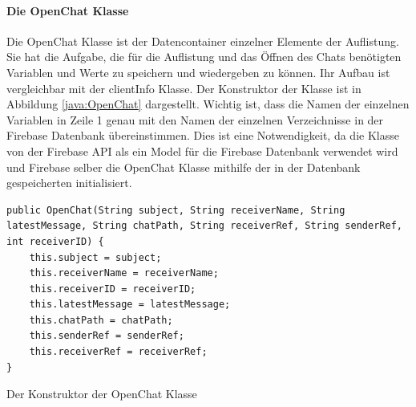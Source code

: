 \documentclass[a4paper,11pt]{report}
\newenvironment{code}{\captionsetup{type=figure}}{}
\begin{document}
			\paragraph{Die OpenChat Klasse}
			Die OpenChat Klasse ist der Datencontainer einzelner Elemente der Auflistung. Sie hat die Aufgabe, die für die Auflistung und das Öffnen des Chats benötigten Variablen und Werte zu speichern und wiedergeben zu können. Ihr Aufbau ist vergleichbar mit der clientInfo Klasse.  Der Konstruktor der Klasse ist in Abbildung \ref{java:OpenChat} dargestellt. Wichtig ist, dass die Namen der einzelnen Variablen in Zeile 1 genau mit den Namen der einzelnen Verzeichnisse in der Firebase Datenbank übereinstimmen. Dies ist eine Notwendigkeit, da die Klasse von der Firebase API als ein Model für die Firebase Datenbank verwendet wird und Firebase selber die OpenChat Klasse mithilfe der in der Datenbank gespeicherten initialisiert.
			
\begin{code}
	\begin{center}
		\begin{verbatim}
public OpenChat(String subject, String receiverName, String latestMessage, String chatPath, String receiverRef, String senderRef, int receiverID) {
	this.subject = subject;
	this.receiverName = receiverName;
	this.receiverID = receiverID;
	this.latestMessage = latestMessage;
	this.chatPath = chatPath;
	this.senderRef = senderRef;
	this.receiverRef = receiverRef;
}					
		\end{verbatim}
	\caption{Der Konstruktor der OpenChat Klasse}\label{java:OpenChat}
	\end{center}
\end{code}	
\end{document}
